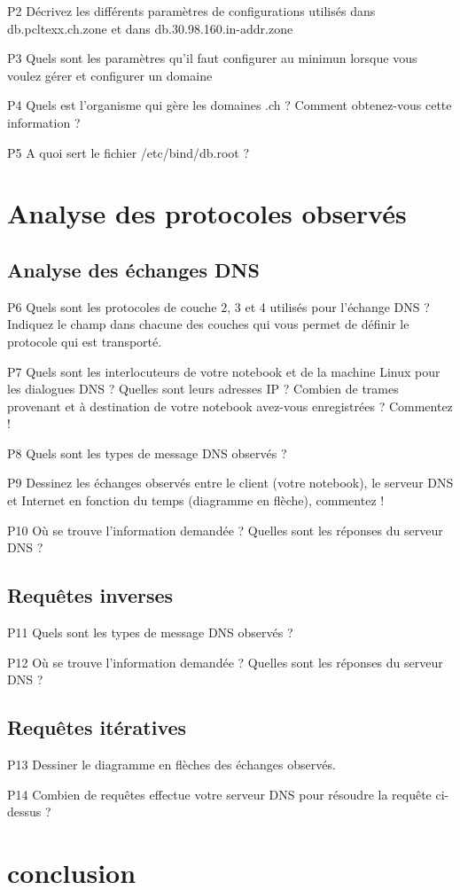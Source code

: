 \documentclass[12pt, openany]{article}
\begin{document}
P2	Décrivez les différents paramètres de configurations utilisés dans db.pcltexx.ch.zone et dans db.30.98.160.in-addr.zone 

P3	Quels sont les paramètres qu’il faut configurer au minimun lorsque vous voulez gérer et configurer un domaine



P4	Quels est l’organisme qui gère les domaines .ch ? Comment obtenez-vous cette information ?

P5	A quoi sert le fichier /etc/bind/db.root ?

\section{Analyse des protocoles observés}

\subsection{Analyse des échanges DNS}

P6	Quels sont les protocoles de couche 2, 3 et 4 utilisés pour l’échange DNS ? Indiquez le champ dans chacune des couches qui vous permet de définir le protocole qui est transporté.

P7	Quels sont les interlocuteurs de votre notebook et de la machine Linux pour les dialogues DNS ? Quelles sont leurs adresses IP ? Combien de trames provenant et à destination de votre notebook avez-vous enregistrées ? Commentez !

P8	Quels sont les types de message DNS observés ?  

P9	Dessinez les échanges observés entre le client (votre notebook), le serveur DNS et Internet en fonction du temps (diagramme en flèche), commentez ! 

P10	Où se trouve l’information demandée ? Quelles sont les réponses du serveur DNS ? 

\subsection{Requêtes inverses}

P11	Quels sont les types de message DNS observés ?  

P12	Où se trouve l’information demandée ? Quelles sont les réponses du serveur DNS ?
\subsection{Requêtes itératives}

P13	Dessiner le diagramme en flèches des échanges observés. 

P14	Combien de requêtes effectue votre serveur DNS pour résoudre la requête ci-dessus ?

\section{conclusion}



\end{document}
